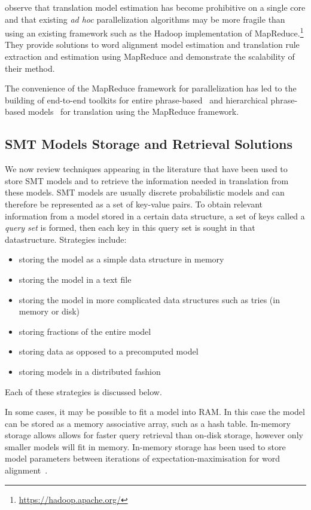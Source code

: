 \citet{dyer-cordova-mont-lin:2008:WMT}
observe that translation model estimation has become prohibitive
on a single core and that existing \emph{ad hoc} parallelization
algorithms may be more fragile than using an existing framework such
as the Hadoop implementation of
MapReduce.\footnote{\url{https://hadoop.apache.org/}}
They provide solutions to word alignment model
estimation and translation rule extraction and estimation using MapReduce
and demonstrate the scalability of their method.

The convenience
of the MapReduce framework for parallelization has led to the building
of end-to-end toolkits for entire phrase-based~\citep{gao-vogel:2010:PBML} and
hierarchical phrase-based models~\citep{venugopal-zollmann:2009:PBML}
for translation using the MapReduce framework.

\subsection{SMT Models Storage and Retrieval Solutions}

We now review techniques appearing in the literature that have been used to
store SMT models and to retrieve the information needed in translation from
these models. SMT models are usually discrete probabilistic models and can
therefore be represented as a set of key-value pairs. To obtain relevant
information from a model stored in a certain data structure, a set of keys called a
\emph{query set} is formed, then each key in this query set is sought in that
datastructure. Strategies include:
%
\begin{itemize}
  \item storing the model as a simple data structure in memory
  \item storing the model in a text file
  \item storing the model in more complicated data structures such as tries (in memory or disk)
  \item storing fractions of the entire model
  \item storing data as opposed to a precomputed model
  \item storing models in a distributed fashion
\end{itemize}
%
Each of these
strategies is discussed below.

In some cases, it may be possible to fit a model into RAM. In
this case the model can be stored as a memory associative array, such as a hash
table. In-memory storage allows allows for faster query retrieval than
on-disk storage, however only smaller models will fit in memory.
In-memory storage has been used to store model
parameters between iterations of expectation-maximisation for word
alignment~\citep{dyer-cordova-mont-lin:2008:WMT,lin-dyer:2010:book}.

